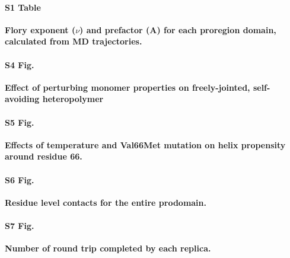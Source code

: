 \documentclass[10pt,letterpaper]{article}
\begin{document}
\paragraph*{S1 Table}
\label{S1_Table}
{\bf Flory exponent ($\nu$) and prefactor (A) for each proregion domain, calculated from MD trajectories.}

\paragraph*{S4 Fig.}
\label{S4_Fig}
{\bf Effect of perturbing monomer properties on freely-jointed, self-avoiding heteropolymer}

\paragraph*{S5 Fig.}
\label{S5_Fig}
{\bf Effects of temperature and Val66Met mutation on helix propensity around residue 66.} 

\paragraph*{S6 Fig.}
\label{S6_Fig}
{\bf Residue level contacts for the entire prodomain.}

\paragraph*{S7 Fig.}
\label{S7_Fig}
{\bf Number of round trip completed by each replica.} 



%
%


\end{document}
